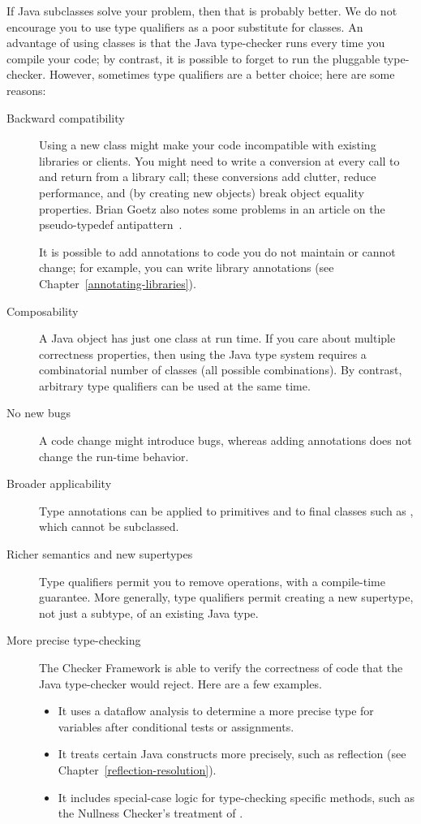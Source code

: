 If Java subclasses solve your problem, then that is probably better.
We do not encourage you to use type qualifiers as a poor substitute for
classes.  An advantage of using classes is that the Java type-checker
runs every time you compile your code;
by contrast, it is possible to forget to run the pluggable
type-checker.  However, sometimes type qualifiers are a
better choice; here are some reasons:

\begin{description}

\item[Backward compatibility]
Using a new class might make your code incompatible with existing libraries or
clients.  You might need to write a conversion at every call to and return
from a library call; these conversions add clutter, reduce performance, and
(by creating new objects) break object equality properties.
Brian Goetz also notes some problems in an article on the
pseudo-typedef antipattern~\cite{Goetz2006:typedef}.

It is possible to add annotations to code you do not maintain or cannot
change; for example, you
can write library annotations (see Chapter~\ref{annotating-libraries}).

\item[Composability]
A Java object has just one class at run time.  If you care about multiple
correctness properties, then using the Java type system requires a
combinatorial number of classes (all possible combinations).  By contrast,
arbitrary type qualifiers can be used at the same time.

\item[No new bugs]
A code change might introduce bugs, whereas adding
annotations does not change the run-time behavior.

\item[Broader applicability]
Type annotations can be applied to primitives and to final classes such as
, which cannot be subclassed.

\item[Richer semantics and new supertypes]
Type qualifiers permit you to remove operations, with a compile-time
guarantee.  More
generally, type qualifiers permit creating a new supertype, not just a
subtype, of an existing Java type.

\item[More precise type-checking]
The Checker Framework is able to verify the correctness of code that the
Java type-checker would reject.  Here are a few examples.
\begin{itemize}
\item
  It uses a dataflow analysis to determine a more precise type for
  variables after conditional tests or assignments.
\item
  It treats certain Java constructs more precisely, such as
  reflection (see Chapter~\ref{reflection-resolution}).
\item
  It includes special-case logic for type-checking specific methods, such
  as the Nullness Checker's treatment of .
\end{itemize}


\end{description}
